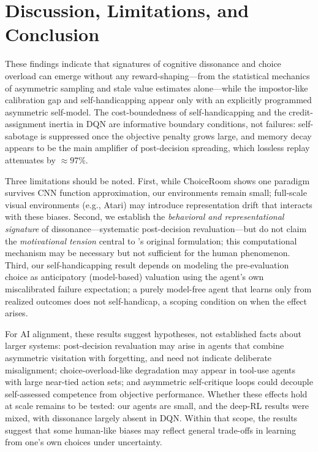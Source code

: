 \documentclass[conference]{IEEEtran}
\begin{document}
\section{Discussion, Limitations, and Conclusion}

These findings indicate that signatures of cognitive dissonance and choice overload can emerge without any reward-shaping---from the statistical mechanics of asymmetric sampling and stale value estimates alone---while the impostor-like calibration gap and self-handicapping appear only with an explicitly programmed asymmetric self-model. The cost-boundedness of self-handicapping and the credit-assignment inertia in DQN are informative boundary conditions, not failures: self-sabotage is suppressed once the objective penalty grows large, and memory decay appears to be the main amplifier of post-decision spreading, which lossless replay attenuates by $\approx97\%$.

Three limitations should be noted. First, while ChoiceRoom shows one paradigm survives CNN function approximation, our environments remain small; full-scale visual environments (e.g., Atari) may introduce representation drift that interacts with these biases. Second, we establish the \textit{behavioral and representational signature} of dissonance---systematic post-decision revaluation---but do not claim the \textit{motivational tension} central to \citet{festinger1957theory}'s original formulation; this computational mechanism may be necessary but not sufficient for the human phenomenon. Third, our self-handicapping result depends on modeling the pre-evaluation choice as anticipatory (model-based) valuation using the agent's own miscalibrated failure expectation; a purely model-free agent that learns only from realized outcomes does not self-handicap, a scoping condition on when the effect arises.

For AI alignment, these results suggest hypotheses, not established facts about larger systems: post-decision revaluation may arise in agents that combine asymmetric visitation with forgetting, and need not indicate deliberate misalignment; choice-overload-like degradation may appear in tool-use agents with large near-tied action sets; and asymmetric self-critique loops could decouple self-assessed competence from objective performance. Whether these effects hold at scale remains to be tested: our agents are small, and the deep-RL results were mixed, with dissonance largely absent in DQN. Within that scope, the results suggest that some human-like biases may reflect general trade-offs in learning from one's own choices under uncertainty.
\end{document}

